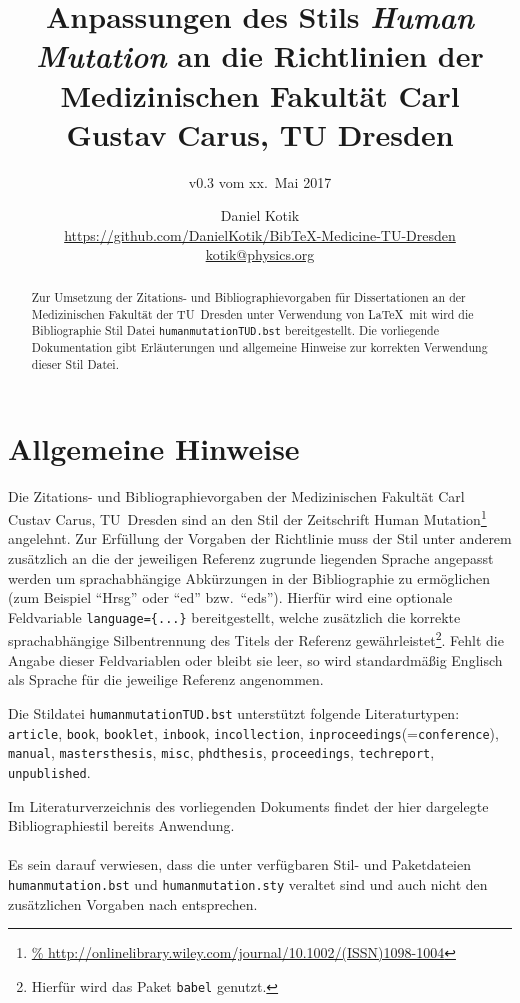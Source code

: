 \documentclass[a4paper,10pt]{scrartcl}
\title{Anpassungen des Stils \emph{Human Mutation} an die
Richtlinien der Medizinischen Fakultät Carl Gustav Carus, TU Dresden}
\subtitle{v0.3 vom xx.~Mai 2017}
\author{Daniel Kotik\\
\large\url{https://github.com/DanielKotik/BibTeX-Medicine-TU-Dresden}\\
\large\url{kotik@physics.org}}
\date{}
\renewcommand{\cite}{\citep}  %
\begin{document}
\setlength{\parindent}{0em}
\maketitle

\begin{abstract}
Zur Umsetzung der Zitations- und Bibliographievorgaben für Dissertationen an
der Medizinischen Fakultät der TU~Dresden unter Verwendung von \LaTeX\ mit
 wird die Bibliographie Stil Datei
\verb|humanmutationTUD.bst| bereitgestellt. Die vorliegende Dokumentation gibt
Erläuterungen und allgemeine Hinweise zur korrekten Verwendung dieser Stil
Datei.
\end{abstract}

\section{Allgemeine Hinweise}
Die Zitations- und Bibliographievorgaben \cite{ZitiervorgabenCGC} der
Medizinischen Fakultät Carl Custav
Carus, TU~Dresden sind an den Stil der Zeitschrift Human
Mutation\footnote{\url{%
http://onlinelibrary.wiley.com/journal/10.1002/(ISSN)1098-1004}} angelehnt.
Zur Erfüllung der Vorgaben der Richtlinie muss der Stil unter anderem zusätzlich
an die der jeweiligen Referenz zugrunde liegenden Sprache angepasst werden um
sprachabhängige Abkürzungen in der Bibliographie zu ermöglichen (zum Beispiel
"`Hrsg"' oder "`ed"' bzw.\ "`eds"').
Hierfür wird eine optionale Feldvariable \verb|language={...}|
bereitgestellt, welche zusätzlich die korrekte sprachabhängige Silbentrennung
des Titels der Referenz gewährleistet\footnote{Hierfür wird das Paket
\verb|babel| genutzt.}. Fehlt die Angabe dieser Feldvariablen oder bleibt sie
leer, so wird standardmä{\ss}ig Englisch als Sprache für die jeweilige Referenz
angenommen.

Die Stildatei \verb|humanmutationTUD.bst| unterstützt folgende Literaturtypen:
\verb|article|, \verb|book|, \verb|booklet|, \verb|inbook|,
\verb|incollection|, \verb|inproceedings|(=\verb|conference|), \verb|manual|,
\verb|mastersthesis|, \verb|misc|, \verb|phdthesis|, \verb|proceedings|,
\verb|techreport|, \verb|unpublished|.


Im Literaturverzeichnis des vorliegenden
Dokuments findet der hier
dargelegte Bibliographiestil bereits Anwendung. \\\\
Es sein darauf verwiesen, dass die unter \cite{humanmutationSchneider}
verfügbaren Stil- und Paketdateien \verb|humanmutation.bst| und
\verb|humanmutation.sty| veraltet sind und auch nicht den zusätzlichen Vorgaben
nach \cite{ZitiervorgabenCGC} entsprechen.
\end{document}
